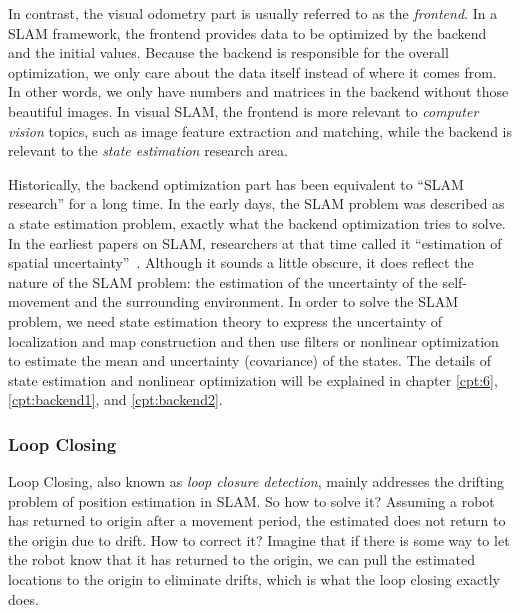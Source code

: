 In contrast, the visual odometry part is usually referred to as the \textit{frontend}. In a SLAM framework, the frontend provides data to be optimized by the backend and the initial values. Because the backend is responsible for the overall optimization, we only care about the data itself instead of where it comes from. In other words, we only have numbers and matrices in the backend without those beautiful images. In visual SLAM, the frontend is more relevant to \textit{computer vision} topics, such as image feature extraction and matching, while the backend is relevant to the \textit{state estimation} research area.

Historically, the backend optimization part has been equivalent to ``SLAM research'' for a long time. In the early days, the SLAM problem was described as a state estimation problem, exactly what the backend optimization tries to solve. In the earliest papers on SLAM, researchers at that time called it ``estimation of spatial uncertainty''~\cite{Smith1986, Smith1990}. Although it sounds a little obscure, it does reflect the nature of the SLAM problem: the estimation of the uncertainty of the self-movement and the surrounding environment. In order to solve the SLAM problem, we need state estimation theory to express the uncertainty of localization and map construction and then use filters or nonlinear optimization to estimate the mean and uncertainty (covariance) of the states. The details of state estimation and nonlinear optimization will be explained in chapter \ref{cpt:6}, \ref{cpt:backend1}, and \ref{cpt:backend2}.

\subsubsection{Loop Closing}
Loop Closing, also known as \textit{loop closure detection}, mainly addresses the drifting problem of position estimation in SLAM. So how to solve it? Assuming a robot has returned to origin after a movement period, the estimated does not return to the origin due to drift. How to correct it? Imagine that if there is some way to let the robot know that it has returned to the origin, we can pull the estimated locations to the origin to eliminate drifts, which is what the loop closing exactly does.

